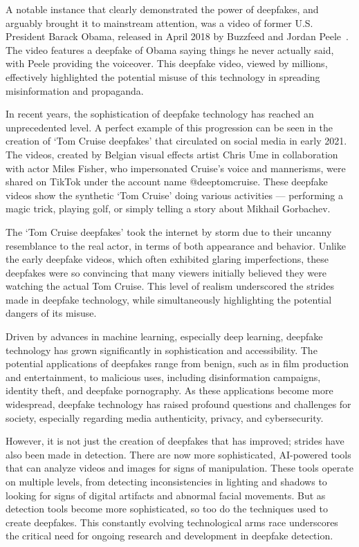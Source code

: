 A notable instance that clearly demonstrated the power of deepfakes, and arguably brought it to
mainstream attention, was a video of former U.S. President Barack Obama, released in April 2018
by Buzzfeed and Jordan Peele~\cite{peele,10.1145/3371409}. The video features a deepfake of Obama 
saying things he never actually said, with Peele providing the voiceover. This deepfake video, 
viewed by millions, effectively highlighted the potential misuse of this technology in spreading 
misinformation and propaganda.

In recent years, the sophistication of deepfake technology has reached an unprecedented level. 
A perfect example of this progression can be seen in the creation of `Tom Cruise deepfakes' 
that circulated on social media in early 2021. The videos, created by Belgian visual effects 
artist Chris Ume in collaboration with actor Miles Fisher, who impersonated Cruise's voice 
and mannerisms, were shared on TikTok under the account name @deeptomcruise. These deepfake 
videos show the synthetic `Tom Cruise' doing various activities --- performing a magic trick, 
playing golf, or simply telling a story about Mikhail Gorbachev.

The `Tom Cruise deepfakes' took the internet by storm due to their uncanny resemblance to the 
real actor, in terms of both appearance and behavior. Unlike the early deepfake videos, which 
often exhibited glaring imperfections, these deepfakes were so convincing that many viewers 
initially believed they were watching the actual Tom Cruise. This level of realism underscored 
the strides made in deepfake technology, while simultaneously highlighting the potential 
dangers of its misuse.

Driven by advances in machine learning, especially deep learning, deepfake technology has
grown significantly in sophistication and accessibility. The potential applications of
deepfakes range from benign, such as in film production and entertainment, to malicious uses,
including disinformation campaigns, identity theft, and deepfake pornography. As these
applications become more widespread, deepfake technology has raised profound questions and
challenges for society, especially regarding media authenticity, privacy, and cybersecurity.

However, it is not just the creation of deepfakes that has improved; strides have also been made 
in detection. There are now more sophisticated, \ac{AI}-powered tools that can analyze videos 
and images for signs of manipulation. These tools operate on multiple levels, from detecting 
inconsistencies in lighting and shadows to looking for signs of digital artifacts and abnormal 
facial movements. But as detection tools become more sophisticated, so too do the techniques 
used to create deepfakes. This constantly evolving technological arms race underscores the 
critical need for ongoing research and development in deepfake detection.

